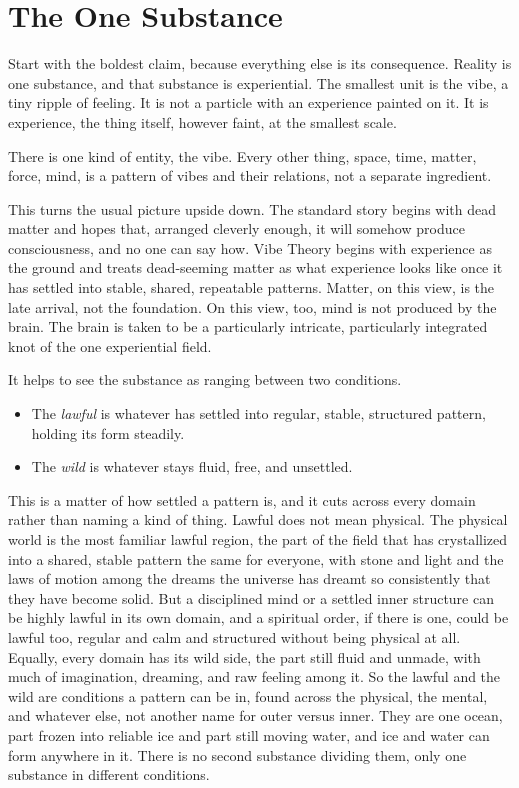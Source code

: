 \section{The One Substance}
\label{sec:thesis}

Start with the boldest claim, because everything else is its consequence. Reality is one
substance, and that substance is experiential. The smallest unit is the vibe, a tiny ripple
of feeling. It is not a particle with an experience painted on it. It is experience, the
thing itself, however faint, at the smallest scale.

\begin{principle}[Monism]
There is one kind of entity, the vibe. Every other thing, space, time, matter, force, mind,
is a pattern of vibes and their relations, not a separate ingredient.
\end{principle}

This turns the usual picture upside down. The standard story begins with dead matter and
hopes that, arranged cleverly enough, it will somehow produce consciousness, and no one can
say how. Vibe Theory begins with experience as the ground and treats dead-seeming matter as
what experience looks like once it has settled into stable, shared, repeatable patterns.
Matter, on this view, is the late arrival, not the foundation. On this view, too, mind is not
produced by the brain. The brain is taken to be a particularly intricate, particularly
integrated knot of the one experiential field.

It helps to see the substance as ranging between two conditions.

\begin{itemize}
\item The \emph{lawful} is whatever has settled into regular, stable, structured pattern,
holding its form steadily.
\item The \emph{wild} is whatever stays fluid, free, and unsettled.
\end{itemize}

This is a matter of how settled a pattern is, and it cuts across every domain rather than
naming a kind of thing. Lawful does not mean physical. The physical world is the most familiar
lawful region, the part of the field that has crystallized into a shared, stable pattern the
same for everyone, with stone and light and the laws of motion among the dreams the universe
has dreamt so consistently that they have become solid. But a disciplined mind or a settled
inner structure can be highly lawful in its own domain, and a spiritual order, if there is one,
could be lawful too, regular and calm and structured without being physical at all. Equally,
every domain has its wild side, the part still fluid and unmade, with much of imagination,
dreaming, and raw feeling among it. So the lawful and the wild are conditions a pattern can be
in, found across the physical, the mental, and whatever else, not another name for outer versus
inner. They are one ocean, part frozen into reliable ice and part still moving water, and ice
and water can form anywhere in it. There is no second substance dividing them, only one
substance in different conditions.

